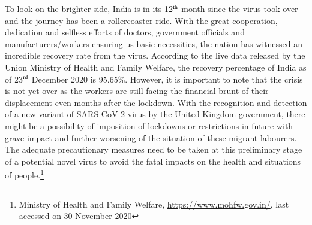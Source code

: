 \begin{multicols}{2}
\noi
To look on the brighter side, India is in its 12$^{\rm th}$ month since the virus took over and the
journey has been a rollercoaster ride. With the great cooperation, dedication and selfless
efforts of doctors, government officials and manufacturers/workers ensuring us basic
necessities, the nation has witnessed an incredible recovery rate from the virus. According to
the live data released by the Union Ministry of Health and Family Welfare, the recovery
percentage of India as of 23$^{\rm rd}$ December 2020 is 95.65\%. However, it is important to note that
the crisis is not yet over as the workers are still facing the financial brunt of their
displacement even months after the lockdown. With the recognition and detection of a new
variant of SARS-CoV-2 virus by the United Kingdom government, there might be a
possibility of imposition of lockdowns or restrictions in future with grave impact and further
worsening of the situation of these migrant labourers. The adequate precautionary measures
need to be taken at this preliminary stage of a potential novel virus to avoid the fatal impacts
on the health and situations of people.\footnote{Ministry of Health and Family Welfare, \url{https://www.mohfw.gov.in/}, last accessed on 30 November 2020}


\end{multicols}
